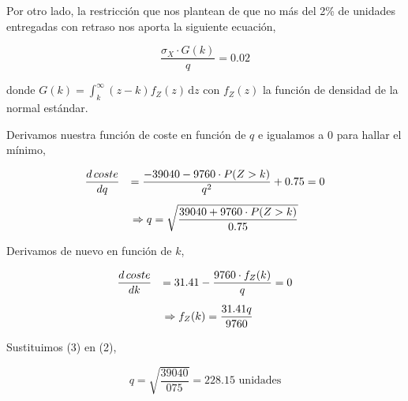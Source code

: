 \documentclass[a4paper,12pt]{article}
\begin{document}
Por otro lado, la restricci\'on que nos plantean de que no m\'as del 2\% de unidades entregadas con retraso nos aporta la siguiente ecuaci\'on,

\begin{equation}
\dfrac{\sigma_X \cdot G(k)}{q} = 0.02
\end{equation}

donde $G(k) = \int_k^\infty (z - k) f_Z(z)\, \mathrm{d}z $ con $f_Z(z)$ la funci\'on de densidad de la normal est\'andar. 

%
%

Derivamos nuestra funci\'on de coste en funci\'on de $q$ e igualamos a $0$ para hallar el m\'inimo,

\begin{equation}\label{ecq}
\begin{array}{l l}

\dfrac{d\text{\,}coste}{dq} & = \dfrac{-39040 - 9760\cdot P(Z > k)}{q^2} + 0.75 = 0\\[.5cm]

& \, \Rightarrow q = \sqrt{\dfrac{39040 + 9760\cdot P(Z > k)}{0.75}} 

\end{array}
\end{equation}


Derivamos de nuevo en funci\'on de $k$,

\begin{equation}\label{eck}
\begin{array}{l l}
\dfrac{d\text{\,}coste}{dk} & = 31.41 - \dfrac{9760\cdot f_Z(k)}{q} = 0 \\[.5cm]
& \, \Rightarrow f_Z(k) = \dfrac{31.41q}{9760}
\end{array}
\end{equation}

Sustituimos (3) en (2), 

$$ q = \sqrt{\dfrac{39040}{075}} = 228.15 \text{ unidades}$$
\end{document}
